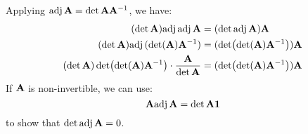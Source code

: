 \begin{sol}
    Applying $\mathrm{adj}\,\mathbf{A} = \det \mathbf{A} \mathbf{A}^{-1}$, we have:
    \begin{align}
        (\det \mathbf{A})\mathrm{adj}\,\mathrm{adj}\,\mathbf{A} &= (\det \mathrm{adj}\,\mathbf{A})\mathbf{A} \\ 
        (\det \mathbf{A})\mathrm{adj}\,(\det(\mathbf{A})\mathbf{A}^{-1}) &=(\det(\det(\mathbf{A})\mathbf{A}^{-1}))\mathbf{A} \\ 
        (\det \mathbf{A})\det(\det(\mathbf{A})\mathbf{A}^{-1})\cdot \frac{\mathbf{A}}{\det \mathbf{A}} &=(\det(\det(\mathbf{A})\mathbf{A}^{-1}))\mathbf{A}
    \end{align}
    If $\mathbf{A}$ is non-invertible, we can use:
    \begin{equation}
        \mathbf{A} \mathrm{adj}\,\mathbf{A} = \det \mathbf{A} \mathbf{1}
    \end{equation}
    to show that $\det \mathrm{adj}\,\mathbf{A} = 0$.
\end{sol}